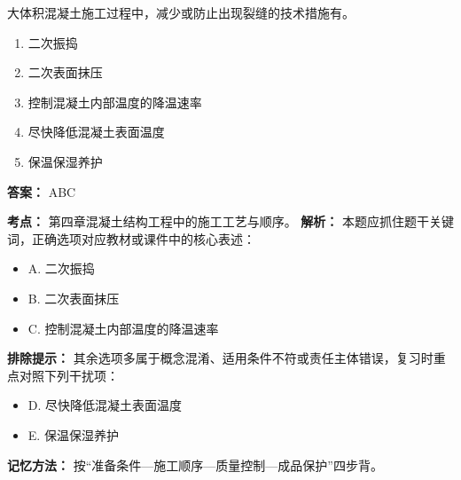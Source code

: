 \documentclass[UTF8,fontset=fandol,11pt]{ctexart}
\begin{document}
\vspace{0.2em}

\begin{quizbox}[title={第 82 题}]
大体积混凝土施工过程中，减少或防止出现裂缝的技术措施有。\\
\begin{enumerate}[label=\Alph*.]
\item 二次振捣
\item 二次表面抹压
\item 控制混凝土内部温度的降温速率
\item 尽快降低混凝土表面温度
\item 保温保湿养护
\end{enumerate}
\textbf{答案：} ABC
\vspace{0.25em}
\begin{answerbox}[title={考点解析}]
\textbf{考点：} 第四章混凝土结构工程中的施工工艺与顺序。
\textbf{解析：} 本题应抓住题干关键词，正确选项对应教材或课件中的核心表述：
\begin{itemize}
\item A. 二次振捣
\item B. 二次表面抹压
\item C. 控制混凝土内部温度的降温速率
\end{itemize}
\textbf{排除提示：} 其余选项多属于概念混淆、适用条件不符或责任主体错误，复习时重点对照下列干扰项：
\begin{itemize}
\item D. 尽快降低混凝土表面温度
\item E. 保温保湿养护
\end{itemize}
\textbf{记忆方法：} 按“准备条件—施工顺序—质量控制—成品保护”四步背。
\end{answerbox}
\end{quizbox}

\vspace{0.2em}
\end{document}

